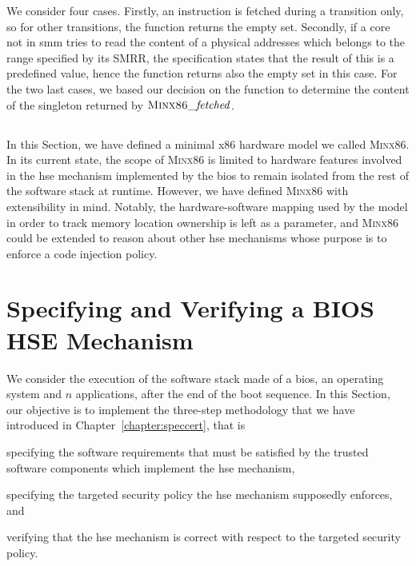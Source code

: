 %
We consider four cases.
%
Firstly, an instruction is fetched during a  transition only, so for
other transitions, the function returns the empty set.
%
Secondly, if a core not in \ac{smm} tries to read the content of a physical
addresses which belongs to the range specified by its SMRR, the specification
states that the result of this \IO is a predefined value, hence the function
returns also the empty set in this case.
%
For the two last cases, we based our decision on the 
function to determine the content of the singleton returned by
\( \textsc{Minx86}\mathit{\_fetched} \).

\subsection*{}

In this Section, we have defined a minimal x86 hardware model we called
{\scshape Minx86}.
%
In its current state, the scope of {\scshape Minx86} is limited to hardware
features involved in the \ac{hse} mechanism implemented by the \ac{bios} to
remain isolated from the rest of the software stack at runtime.
%
However, we have defined {\scshape Minx86} with extensibility in mind.
%
Notably, the hardware-software mapping used by the model in order to track
memory location ownership is left as a parameter, and {\scshape Minx86} could be
extended to reason about other \ac{hse} mechanisms whose purpose is to enforce a
code injection policy.

\section{Specifying and Verifying a BIOS HSE Mechanism}
\label{sec:speccert2:verif}

We consider the execution of the software stack made of a \ac{bios}, an
operating system and \( n \) applications, after the end of the boot sequence.
%
In this Section, our objective is to implement the three-step methodology that
we have introduced in Chapter~\ref{chapter:speccert}, that is
%
\begin{inparaenum}[(1)]
\item specifying the software requirements that must be satisfied by the trusted
  software components which implement the \ac{hse} mechanism,
%
\item specifying the targeted security policy the \ac{hse} mechanism supposedly
  enforces, and
%
\item verifying that the \ac{hse} mechanism is correct with respect to the
  targeted security policy.
\end{inparaenum}

